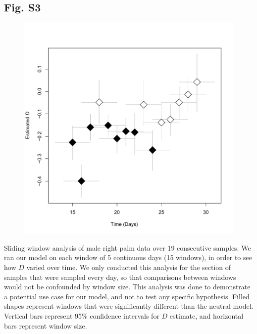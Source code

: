 \documentclass{article}
\begin{document}
{\subsection{Fig. S3}\label{sec:figureS3}
\begin{figure}[ht]
	\centering
	\includegraphics[scale=0.80]{figs/Fig_S3.pdf}
\end{figure}
Sliding window analysis of male right palm data over 19 consecutive samples. We ran our model on each window of 5 continuous days (15 windows), in order to see how \(D\) varied over time. We only conducted this analysis for the section of samples that were sampled every day, so that comparisons between windows would not be confounded by window size. This analysis was done to demonstrate a potential use case for our model, and not to test any specific hypothesis. Filled shapes represent windows that were significantly different than the neutral model. Vertical bars represent 95\% confidence intervals for \(D\) estimate, and horizontal bars represent window size.
\newpage

}
\end{document}
